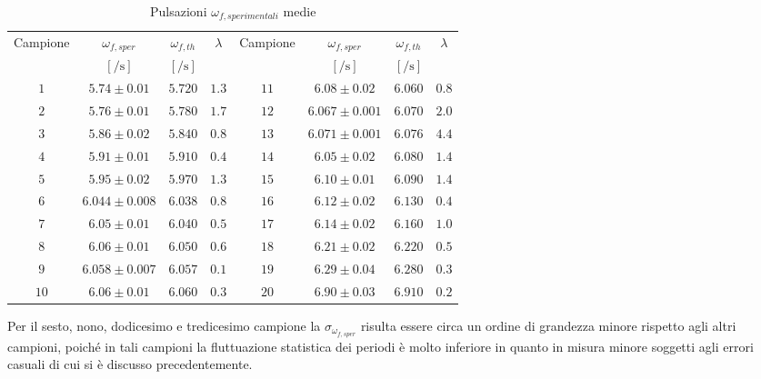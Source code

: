 \documentclass[a4paper,11pt,oneside]{article}
\begin{document}
\begin{table}[h!]
    \centering
    \begin{tabular}{|c|c|c|c||c|c|c|c|}
        \hline
        \multirow{2}{*}{Campione} & $\omega_{f,sper}$ & $\omega_{f,th}$ & \multirow{2}{*}{$\lambda$} & \multirow{2}{*}{Campione} & $\omega_{f,sper}$ & $\omega_{f,th}$ & \multirow{2}{*}{$\lambda$}\\
         & $[\si{\per\second}]$&$[\si{\per\second}]$ &  & & $[\si{\per\second}]$&$[\si{\per\second}]$ &\\
        \hline
        \rowcolor[rgb]{0.85,0.85,0.85}$1$ & $5.74\pm0.01$ & $5.720$ & $1.3$ & $11$ & $6.08\pm0.02$ & $6.060$ & $0.8$\\ \hline
        $2$ & $5.76\pm0.01$ & $5.780$ & $1.7$ & $12$ & $6.067\pm0.001$ & $6.070$ & $2.0$\\ \hline
        \rowcolor[rgb]{0.85,0.85,0.85}$3$ & $5.86\pm0.02$ & $5.840$ & $0.8$ & $13$ & $6.071\pm0.001$ & $6.076$ & $4.4$\\ \hline
        $4$ & $5.91\pm0.01$ & $5.910$ & $0.4$ & $14$ & $6.05\pm0.02$ & $6.080$ & $1.4$\\ \hline
        \rowcolor[rgb]{0.85,0.85,0.85}$5$ & $5.95\pm0.02$ & $5.970$ & $1.3$ & $15$ & $6.10\pm0.01$ & $6.090$ & $1.4$\\ \hline
        $6$ & $6.044\pm0.008$ & $6.038$ & $0.8$ & $16$ & $6.12\pm0.02$ & $6.130$ & $0.4$\\ \hline
        \rowcolor[rgb]{0.85,0.85,0.85}$7$ & $6.05\pm0.01$ & $6.040$ & $0.5$ & $17$ & $6.14\pm0.02$ & $6.160$ & $1.0$\\ \hline
        $8$ & $6.06\pm0.01$ & $6.050$ & $0.6$ & $18$ & $6.21\pm0.02$ & $6.220$ & $0.5$\\ \hline
        \rowcolor[rgb]{0.85,0.85,0.85}$9$ & $6.058\pm0.007$ & $6.057$ & $0.1$ & $19$ & $6.29\pm0.04$ & $6.280$ & $0.3$\\ \hline
        $10$ & $6.06\pm0.01$ & $6.060$ & $0.3$ & $20$ & $6.90\pm0.03$ & $6.910$ & $0.2$\\ \hline
    \end{tabular}
    \caption{Pulsazioni $\omega_{f, sperimentali}$ medie}
    \label{tab:periodi_medi}
\end{table}

Per il sesto, nono, dodicesimo e tredicesimo campione la $\sigma_{\omega_{f, sper}}$ risulta essere circa un ordine di grandezza minore rispetto agli altri campioni, poiché in tali campioni la fluttuazione statistica dei periodi è molto inferiore in quanto in misura minore soggetti agli errori casuali di cui si è discusso precedentemente.
\end{document}
